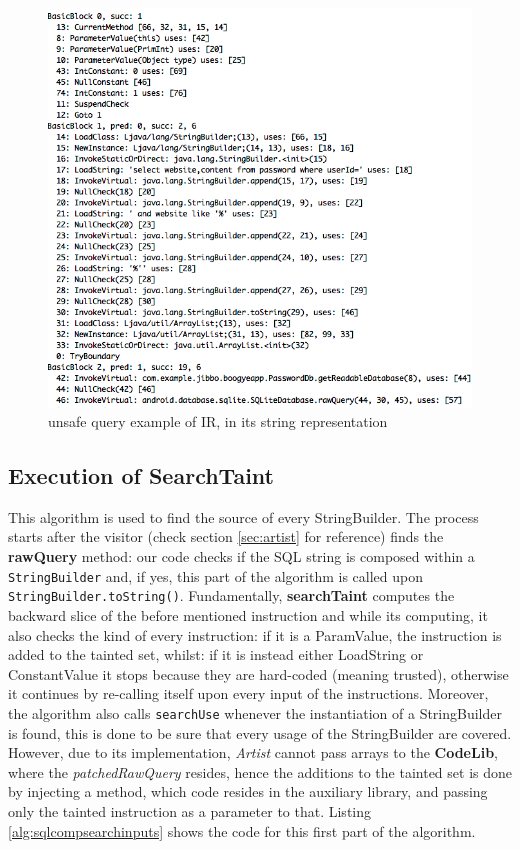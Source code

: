 \begin{figure}
	\centering
	\includegraphics[scale=0.7]{img/query_graph.png}
	\caption{unsafe query example of IR, in its string representation}
    \label{fig:querygraph}
\end{figure}
\newpage
\subsection{Execution of SearchTaint}
This algorithm is used to find the source of every StringBuilder. The process starts after the visitor (check section \ref{sec:artist} for reference) finds the \textbf{rawQuery} method: our code checks if the SQL string is composed within a \texttt{StringBuilder} and, if yes, this part of the algorithm is called upon \texttt{StringBuilder.toString()}. Fundamentally, \textbf{searchTaint} computes the backward slice of the before mentioned instruction and while its computing, it also checks the kind of every instruction: if it is a ParamValue, the instruction is added to the tainted set, whilst: if it is instead either LoadString or ConstantValue it stops because they are hard-coded (meaning trusted), otherwise it continues by re-calling itself upon every input of the instructions. Moreover, the algorithm also calls \texttt{searchUse} whenever the instantiation of a StringBuilder is found, this is done to be sure that every usage of the StringBuilder are covered. However, due to its implementation, \emph{Artist} cannot pass arrays to the \textbf{CodeLib}, where the \emph{patchedRawQuery} resides, hence the additions to the tainted set is done by injecting a method, which code resides in the auxiliary library, and passing only the tainted instruction as a parameter to that. Listing \ref{alg:sqlcompsearchinputs} shows the code for this first part of the algorithm.

